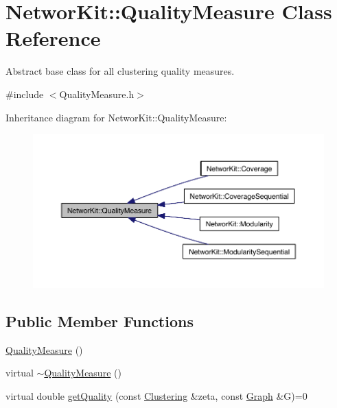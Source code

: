 \hypertarget{class_networ_kit_1_1_quality_measure}{\section{Networ\-Kit\-:\-:Quality\-Measure Class Reference}
\label{class_networ_kit_1_1_quality_measure}
}


Abstract base class for all clustering quality measures.  




{\ttfamily \#include $<$Quality\-Measure.\-h$>$}



Inheritance diagram for Networ\-Kit\-:\-:Quality\-Measure\-:\nopagebreak
\begin{figure}[H]
\begin{center}
\leavevmode
\includegraphics[width=350pt]{class_networ_kit_1_1_quality_measure__inherit__graph}
\end{center}
\end{figure}
\subsection*{Public Member Functions}
\begin{DoxyCompactItemize}
\item 
\hyperlink{class_networ_kit_1_1_quality_measure_ac2b1c035d218ad96d1c6033db44daf28}{Quality\-Measure} ()
\item 
virtual \hyperlink{class_networ_kit_1_1_quality_measure_a759a5867966736d4ce6600c3d9c1cfce}{$\sim$\-Quality\-Measure} ()
\item 
virtual double \hyperlink{class_networ_kit_1_1_quality_measure_af087ed18a264727c7eef24ae45aefe31}{get\-Quality} (const \hyperlink{class_networ_kit_1_1_clustering}{Clustering} \&zeta, const \hyperlink{class_networ_kit_1_1_graph}{Graph} \&G)=0
\end{DoxyCompactItemize}


